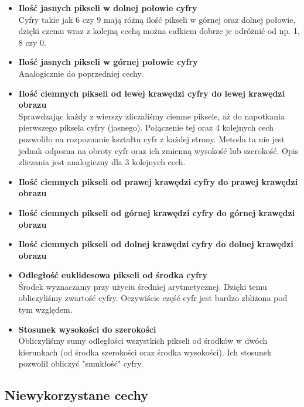 \documentclass{classrep}
\begin{document}
\begin{itemize}
\item \textbf{Ilość jasnych pikseli w dolnej połowie cyfry}\\
 Cyfry takie jak 6 czy 9 mają  różną ilość pikseli w górnej oraz dolnej połowie, dzięki czemu wraz z kolejną cechą można całkiem dobrze je odróżnić od np. 1, 8 czy 0.
\item \textbf{Ilość jasnych pikseli w górnej połowie cyfry}\\
 Analogicznie do poprzedniej cechy.
\item \textbf{Ilość ciemnych pikseli od lewej krawędzi cyfry do lewej krawędzi obrazu}\\
Sprawdzając każdy z wierszy zliczaliśmy ciemne piksele, aż do napotkania pierwszego piksela cyfry (jasnego). Połączenie tej oraz 4 kolejnych cech pozwoliło na rozpoznanie kształtu cyfr z każdej strony. Metoda ta nie jest jednak odporna na obroty cyfr oraz ich zmienną wysokość lub szerokość. Opis zliczania jest analogiczny dla 3 kolejnych cech.
\item \textbf{Ilość ciemnych pikseli od prawej krawędzi cyfry do prawej krawędzi obrazu}
\item \textbf{Ilość ciemnych pikseli od górnej krawędzi cyfry do górnej krawędzi obrazu}
\item \textbf{Ilość ciemnych pikseli od dolnej krawędzi cyfry do dolnej krawędzi obrazu}
\item \textbf{Odległość euklidesowa pikseli od środka cyfry}\\
 Środek wyznaczamy przy użyciu średniej arytmetycznej. Dzięki temu obliczyliśmy zwartość cyfry. Oczywiście część cyfr jest bardzo zbliżona pod tym względem.
\item \textbf{Stosunek wysokości do szerokości}\\
 Obliczyliśmy sumy odległości wszystkich pikseli od środków w dwóch kierunkach (od środka szerokości oraz środka wysokości). Ich stosunek pozwolił obliczyć "smukłość" cyfry. 
\end{itemize}

\subsection{Niewykorzystane cechy}
\end{document}

